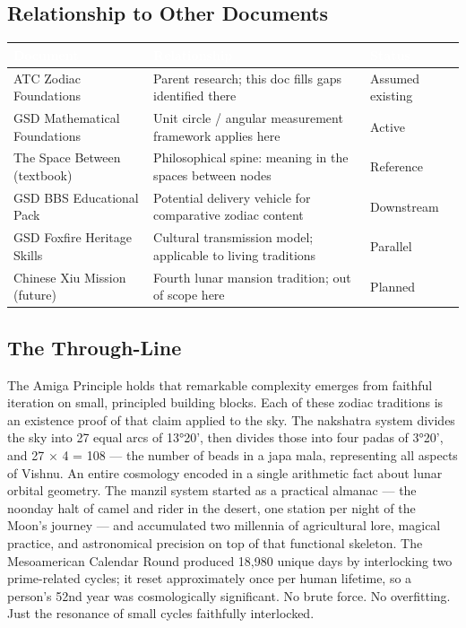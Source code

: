 \documentclass[11pt,letterpaper]{article}
\newcommand{\tableheader}[1]{\textbf{\sffamily\textcolor{white}{#1}}}
\begin{document}
\subsection{Relationship to Other Documents}

\begin{center}
\begin{tabularx}{\textwidth}{L{3.5cm}XC{2cm}}
\toprule
{}
\tableheader{Document} & \tableheader{Relationship} & \tableheader{Status} \\
\midrule
ATC Zodiac Foundations & Parent research; this doc fills gaps identified there & Assumed existing \\
GSD Mathematical Foundations & Unit circle / angular measurement framework applies here & Active \\
The Space Between (textbook) & Philosophical spine: meaning in the spaces between nodes & Reference \\
GSD BBS Educational Pack & Potential delivery vehicle for comparative zodiac content & Downstream \\
GSD Foxfire Heritage Skills & Cultural transmission model; applicable to living traditions & Parallel \\
Chinese Xiu Mission (future) & Fourth lunar mansion tradition; out of scope here & Planned \\
\bottomrule
\end{tabularx}
\end{center}

\subsection{The Through-Line}

The Amiga Principle holds that remarkable complexity emerges from faithful iteration on small, principled building blocks. Each of these zodiac traditions is an existence proof of that claim applied to the sky. The nakshatra system divides the sky into 27 equal arcs of 13°20', then divides those into four padas of 3°20', and 27 × 4 = 108 --- the number of beads in a japa mala, representing all aspects of Vishnu. An entire cosmology encoded in a single arithmetic fact about lunar orbital geometry. The manzil system started as a practical almanac --- the noonday halt of camel and rider in the desert, one station per night of the Moon's journey --- and accumulated two millennia of agricultural lore, magical practice, and astronomical precision on top of that functional skeleton. The Mesoamerican Calendar Round produced 18,980 unique days by interlocking two prime-related cycles; it reset approximately once per human lifetime, so a person's 52nd year was cosmologically significant. No brute force. No overfitting. Just the resonance of small cycles faithfully interlocked.
\end{document}
